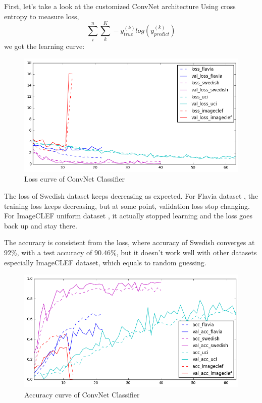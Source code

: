 \documentclass[journal, 10pt]{IEEEtran}
\begin{document}
First, let's take a look at the customized ConvNet architecture
Using cross entropy to measure loss,
\begin{equation*}
  \sum_i^n\sum_k^K -y_{true}^{(k)} log(y_{predict}^{(k)})
\end{equation*}
we got the learning curve:
\begin{figure}[H]
  \centering
  \includegraphics[scale=0.4]{cnn_loss}
  \caption{Loss curve of ConvNet Classifier}
  \label{cnn_loss}
\end{figure}
The loss of Swedish dataset \cite{SwedishLeafDataset} keeps decreasing as expected. For Flavia dataset \cite{FlaviaDataset}, the training loss keeps decreasing, but at some point, validation loss stop changing. For ImageCLEF uniform dataset \cite{ImageCLEF2013}, it actually stopped learning and the loss goes back up and stay there.

The accuracy is consistent from the loss, where accuracy of Swedish converges at $92\%$, with a test accuracy of $90.46\%$, but it doesn't work well with other datasets especially ImageCLEF dataset, which equals to random guessing.
\begin{figure}[H]
  \centering
  \includegraphics[scale=0.4]{cnn_acc}
  \caption{\label{fig:cnn_acc} Accuracy curve of ConvNet Classifier}
  \label{cnn_acc}
\end{figure}
\end{document}
